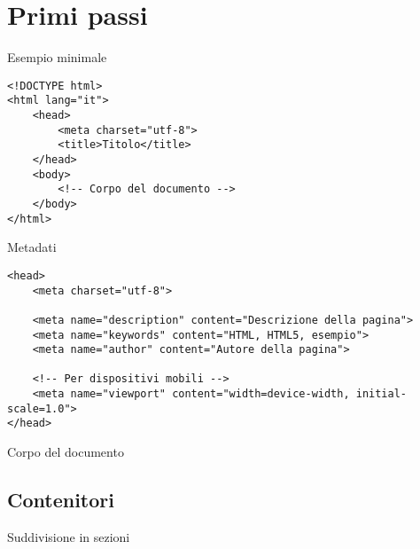 \section{Primi passi}

\begin{frame}[fragile]{Esempio minimale}\transfade\centering
  \begin{verbatim}
<!DOCTYPE html>
<html lang="it">
    <head>
        <meta charset="utf-8">
        <title>Titolo</title>
    </head>
    <body>
        <!-- Corpo del documento -->
    </body>
</html>
  \end{verbatim}
\end{frame}

\begin{frame}[fragile]{Metadati}\transfade\centering
  \begin{verbatim}
<head>
    <meta charset="utf-8">

    <meta name="description" content="Descrizione della pagina">
    <meta name="keywords" content="HTML, HTML5, esempio">
    <meta name="author" content="Autore della pagina">

    <!-- Per dispositivi mobili -->
    <meta name="viewport" content="width=device-width, initial-scale=1.0">
</head>
  \end{verbatim}
\end{frame}

\begin{frame}[fragile]{Corpo del documento}\transfade\centering
\end{frame}

\subsection{Contenitori}

\begin{frame}[fragile]{Suddivisione in sezioni}\transfade\centering
\end{frame}

